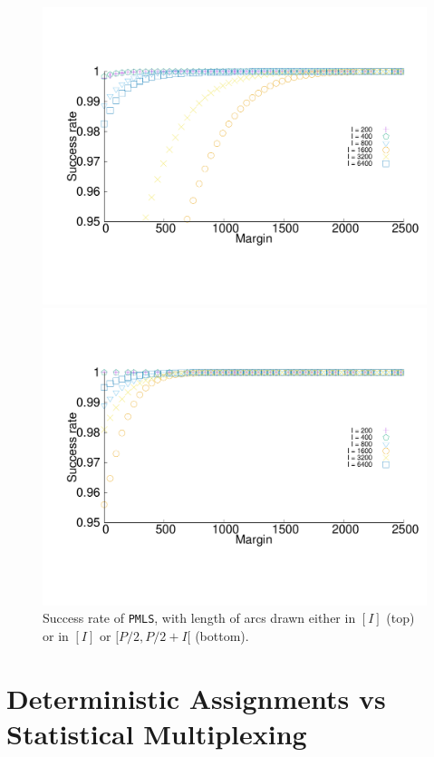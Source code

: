 \documentclass[a4paper,10pt]{journal}
\newcommand\PMLS{\texttt{PMLS}\xspace}
\begin{document}
           \begin{figure}
 
    
       \begin{center}
      \includegraphics[width = 0.9\linewidth]{departs_distrib1Grp.pdf}
     
     
     

      \includegraphics[width = 0.9\linewidth]{departs_distrib2Grp.pdf}
   
  
         \end{center}
         \caption{Success rate of \PMLS, with length of arcs drawn either in $[I]$ (top) or in $[I]$ or $[P/2,P/2 + I[$ (bottom).}
      \label{fig:2grp} 
  \end{figure}
\section{Deterministic Assignments vs Statistical Multiplexing}\label{sec:comparison}
\end{document}
